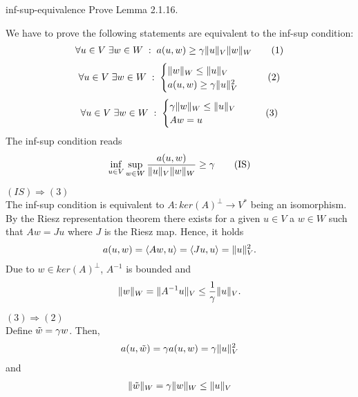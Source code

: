 \begin{Problem}{inf-sup-equivalence}
  Prove Lemma 2.1.16.
\begin{solution}
  We have to prove the following statements are equivalent to the inf-sup condition:
  \begin{align}
    \forall u\in V \;\exists w\in W \;:\; a(u,w) \ge \gamma \lVert u\rVert_V\lVert w\rVert_W     \tag{1}
  \end{align}
  \begin{align}
   \begin{aligned}
    \forall u\in V \;\exists w\in W \;:\;
    \begin{cases}
      \lVert w\rVert_W \le\lVert u\rVert_V\\
      a(u,w) \ge \gamma \lVert u\rVert_V^2
    \end{cases}
   \end{aligned}
   \tag{2}
  \end{align}
  \begin{align}
   \begin{aligned}
    \forall u\in V \;\exists w\in W \;:\;
    \begin{cases}
      \gamma \lVert w\rVert_W \le \lVert u\rVert_V\\
      Aw = u
      \end{cases}
  \end{aligned}
      \tag{3}
  \end{align}
  The inf-sup condition reads
  \begin{align}
   \inf_{u\in V} \sup_{w\in W} \frac{a(u,w)}{\lVert u\rVert_V\lVert w\rVert_W} \ge \gamma \tag{IS}
  \end{align}

  $(IS)\Rightarrow(3)$\\
  The inf-sup condition is equivalent to $A: ker(A)^\perp\to V^*$ being an isomorphism.
  By the Riesz representation theorem there exists for a given $u\in V$ a $w\in W$ such that
  $Aw=J u$ where $J$ is the Riesz map. Hence, it holds
  \begin{align*}
a(u,w)=\langle A w, u\rangle = \langle J u, u\rangle = \lVert u\rVert_V^2.
  \end{align*}
 Due to $w\in ker(A)^\perp$, $A^{-1}$ is bounded and
 \begin{align*}
 \lVert w\rVert_W=\lVert A^{-1}u\rVert_V\leq \frac{1}{\gamma}\lVert u\rVert_V.
  \end{align*}

  $(3)\Rightarrow(2)$ \\
  Define $\tilde{w}=\gamma w$. Then,
  \begin{align*}
a(u,\tilde{w})=\gamma a(u,w) = \gamma \lVert u\rVert_V^2
  \end{align*}
  and
  \begin{align*}
\lVert\tilde{w}\rVert_W=\gamma \lVert w\rVert_W\leq\lVert u\rVert_V
  \end{align*}


\end{solution}
\end{Problem}
